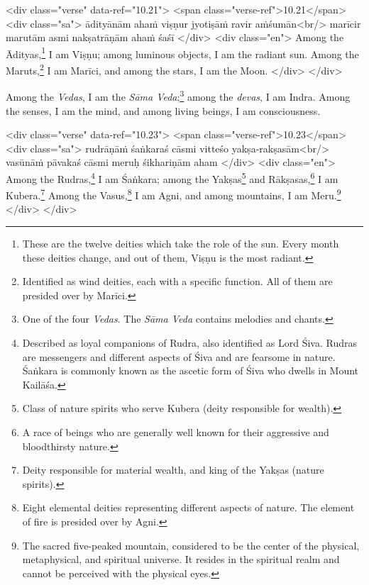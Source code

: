\begin{html}
<div class="verse" data-ref="10.21">
  <span class="verse-ref">10.21</span>
  <div class="sa">
    ādityānām ahaṁ viṣṇur jyotiṣāṁ ravir aṁśumān<br/>
    marīcir marutām asmi nakṣatrāṇām ahaṁ śaśī
  </div>
  <div class="en">
    Among the Ādityas,\footnote{These are the twelve deities which take the role of the sun. Every month these deities change, and out of them, Viṣṇu is the most radiant.} I am Viṣṇu; among luminous objects, I am the radiant sun. Among the Maruts,\footnote{Identified as wind deities, each with a specific function. All of them are presided over by Marīci.} I am Marīci, and among the stars, I am the Moon.
  </div>
</div>
\end{html}


{Among the \textit{Vedas}, I am the \textit{Sāma Veda};\footnote{One of the four \textit{Vedas}. The \textit{Sāma Veda} contains melodies and chants.} among the \textit{devas}, I am Indra. Among the senses, I am the mind, and among living beings, I am consciousness.}


\begin{html}
<div class="verse" data-ref="10.23">
  <span class="verse-ref">10.23</span>
  <div class="sa">
    rudrāṇāṁ śaṅkaraś cāsmi vitteśo yakṣa-rakṣasām<br/>
    vasūnāṁ pāvakaś cāsmi meruḥ śikhariṇām aham
  </div>
  <div class="en">
    Among the Rudras,\footnote{Described as loyal companions of Rudra, also identified as Lord Śiva. Rudras are messengers and different aspects of Śiva and are fearsome in nature. Śaṅkara is commonly known as the ascetic form of Śiva who dwells in Mount Kailāśa.} I am Śaṅkara; among the Yakṣas\footnote{Class of nature spirits who serve Kubera (deity responsible for wealth).} and Rākṣasas,\footnote{A race of beings who are generally well known for their aggressive and bloodthirsty nature.} I am Kubera.\footnote{Deity responsible for material wealth, and king of the Yakṣas (nature spirits).} Among the Vasus,\footnote{Eight elemental deities representing different aspects of nature. The element of fire is presided over by Agni.} I am Agni, and among mountains, I am Meru.\footnote{The sacred five-peaked mountain, considered to be the center of the physical, metaphysical, and spiritual universe. It resides in the spiritual realm and cannot be perceived with the physical eyes.}
  </div>
</div>
\end{html}


